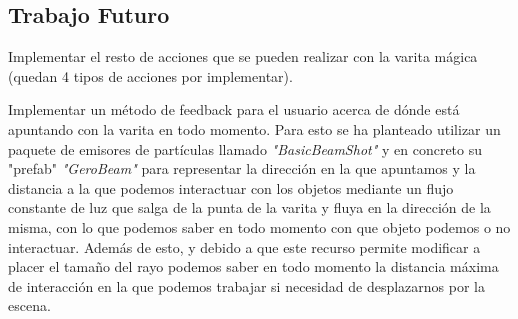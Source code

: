 \documentclass[12pt,a4paper]{article}
\begin{document}
\subsection{Trabajo Futuro}

Implementar el resto de acciones que se pueden realizar con la varita mágica (quedan 4 tipos de acciones por implementar).

Implementar un método de feedback para el usuario acerca de dónde está apuntando con la varita en todo momento. Para esto se ha planteado utilizar un paquete de emisores de partículas llamado \textit{"BasicBeamShot"} y en concreto su "prefab" \textit{"GeroBeam"} para representar la dirección en la que apuntamos y la distancia a la que podemos interactuar con los objetos mediante un flujo constante de luz que salga de la punta de la varita y fluya en la dirección de la misma, con lo que podemos saber en todo momento con que objeto podemos o no interactuar. Además de esto, y debido a que este recurso permite modificar a placer el tamaño del rayo podemos saber en todo momento la distancia máxima de interacción en la que podemos trabajar si necesidad de desplazarnos por la escena.

\break
\end{document}
